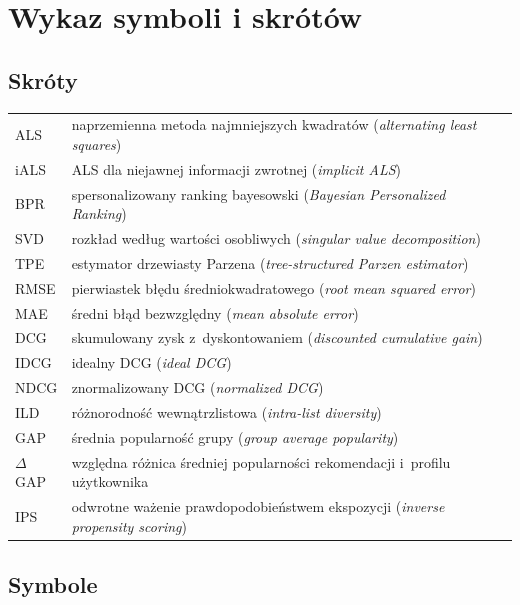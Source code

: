 \chapter*{Wykaz symboli i skrótów}

\section*{Skróty}

\begin{longtable}{@{}p{}p{}@{}}
ALS & naprzemienna metoda najmniejszych kwadratów (\textit{alternating least squares}) \\
iALS & ALS dla niejawnej informacji zwrotnej (\textit{implicit ALS}) \\
BPR & spersonalizowany ranking bayesowski (\textit{Bayesian Personalized Ranking}) \\
SVD & rozkład według wartości osobliwych (\textit{singular value decomposition}) \\
TPE & estymator drzewiasty Parzena (\textit{tree-structured Parzen estimator}) \\
RMSE & pierwiastek błędu średniokwadratowego (\textit{root mean squared error}) \\
MAE & średni błąd bezwzględny (\textit{mean absolute error}) \\
DCG & skumulowany zysk z~dyskontowaniem (\textit{discounted cumulative gain}) \\
IDCG & idealny DCG (\textit{ideal DCG}) \\
NDCG & znormalizowany DCG (\textit{normalized DCG}) \\
ILD & różnorodność wewnątrzlistowa (\textit{intra-list diversity}) \\
GAP & średnia popularność grupy (\textit{group average popularity}) \\
$\Delta$GAP & względna różnica średniej popularności rekomendacji i~profilu użytkownika \\
IPS & odwrotne ważenie prawdopodobieństwem ekspozycji (\textit{inverse propensity scoring})
\end{longtable}

\section*{Symbole}

